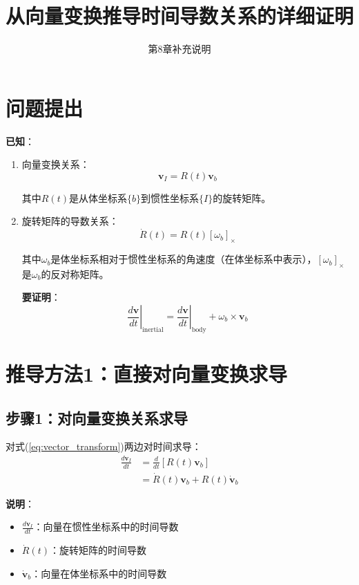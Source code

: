 \documentclass[12pt,a4paper]{article}
\title{从向量变换推导时间导数关系的详细证明}
\author{第8章补充说明}
\date{}
\begin{document}
\maketitle

\section{问题提出}

\textbf{已知}：
\begin{enumerate}
\item 向量变换关系：
\begin{equation}
\bm{v}_I = R(t) \bm{v}_b
\label{eq:vector_transform}
\end{equation}

其中$R(t)$是从体坐标系$\{b\}$到惯性坐标系$\{I\}$的旋转矩阵。

\item 旋转矩阵的导数关系：
\begin{equation}
\dot{R}(t) = R(t) [\omega_b]_{\times}
\label{eq:rotation_derivative}
\end{equation}

其中$\omega_b$是体坐标系相对于惯性坐标系的角速度（在体坐标系中表示），$[\omega_b]_{\times}$是$\omega_b$的反对称矩阵。

\textbf{要证明}：
\begin{equation}
\left.\frac{d\bm{v}}{dt}\right|_{\text{inertial}} = \left.\frac{d\bm{v}}{dt}\right|_{\text{body}} + \omega_b \times \bm{v}_b
\label{eq:target}
\end{equation}
\end{enumerate}

\section{推导方法1：直接对向量变换求导}

\subsection{步骤1：对向量变换关系求导}

对式(\ref{eq:vector_transform})两边对时间求导：
\begin{align}
\frac{d\bm{v}_I}{dt} &= \frac{d}{dt}[R(t) \bm{v}_b] \\
&= \dot{R}(t) \bm{v}_b + R(t) \dot{\bm{v}}_b
\label{eq:derivative_expanded}
\end{align}

\textbf{说明}：
\begin{itemize}
\item $\frac{d\bm{v}_I}{dt}$：向量在惯性坐标系中的时间导数
\item $\dot{R}(t)$：旋转矩阵的时间导数
\item $\dot{\bm{v}}_b$：向量在体坐标系中的时间导数
\end{itemize}
\end{document}
